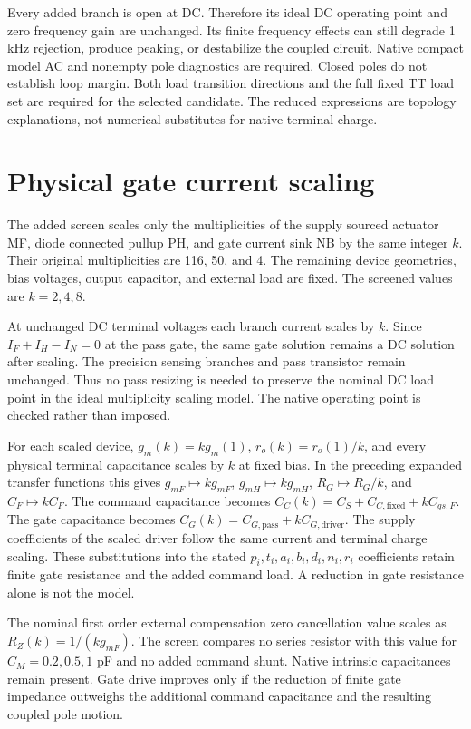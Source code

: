 Every added branch is open at DC. Therefore its ideal DC operating point and zero frequency gain are unchanged. Its finite frequency effects can still degrade 1 kHz rejection, produce peaking, or destabilize the coupled circuit. Native compact model AC and nonempty pole diagnostics are required. Closed poles do not establish loop margin. Both load transition directions and the full fixed TT load set are required for the selected candidate. The reduced expressions are topology explanations, not numerical substitutes for native terminal charge.


\section{Physical gate current scaling}
The added screen scales only the multiplicities of the supply sourced actuator MF, diode connected pullup PH, and gate current sink NB by the same integer $k$. Their original multiplicities are 116, 50, and 4. The remaining device geometries, bias voltages, output capacitor, and external load are fixed. The screened values are $k=2,4,8$.

At unchanged DC terminal voltages each branch current scales by $k$. Since $I_F+I_H-I_N=0$ at the pass gate, the same gate solution remains a DC solution after scaling. The precision sensing branches and pass transistor remain unchanged. Thus no pass resizing is needed to preserve the nominal DC load point in the ideal multiplicity scaling model. The native operating point is checked rather than imposed.

For each scaled device, $g_m(k)=kg_m(1)$, $r_o(k)=r_o(1)/k$, and every physical terminal capacitance scales by $k$ at fixed bias. In the preceding expanded transfer functions this gives $g_{mF}\mapsto kg_{mF}$, $g_{mH}\mapsto kg_{mH}$, $R_G\mapsto R_G/k$, and $C_F\mapsto kC_F$. The command capacitance becomes $C_C(k)=C_S+C_{C,\mathrm{fixed}}+kC_{gs,F}$. The gate capacitance becomes $C_G(k)=C_{G,\mathrm{pass}}+kC_{G,\mathrm{driver}}$. The supply coefficients of the scaled driver follow the same current and terminal charge scaling. These substitutions into the stated $p_i,t_i,a_i,b_i,d_i,n_i,r_i$ coefficients retain finite gate resistance and the added command load. A reduction in gate resistance alone is not the model.

The nominal first order external compensation zero cancellation value scales as $R_Z(k)=1/(kg_{mF})$. The screen compares no series resistor with this value for $C_M=0.2,0.5,1$ pF and no added command shunt. Native intrinsic capacitances remain present. Gate drive improves only if the reduction of finite gate impedance outweighs the additional command capacitance and the resulting coupled pole motion.

